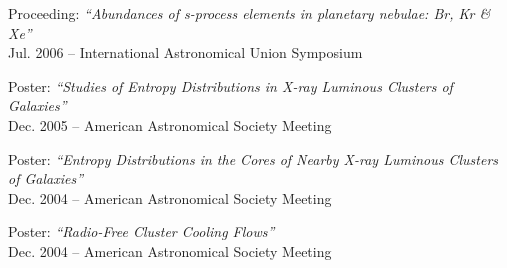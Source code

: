 \documentclass[12pt]{cv}
\begin{document}
\begin{llist}
{\sc Proceeding: {\textit{``Abundances of s-process elements in planetary nebulae: Br, Kr \& Xe''}}}\\
Jul. 2006 -- International Astronomical Union Symposium

{\sc Poster: {\textit{``Studies of Entropy Distributions in X-ray Luminous Clusters of Galaxies''}}}\\
Dec. 2005 -- American Astronomical Society Meeting

{\sc Poster: {\textit{``Entropy Distributions in the Cores of Nearby X-ray Luminous Clusters of Galaxies''}}}\\
Dec. 2004 -- American Astronomical Society Meeting

{\sc Poster: {\textit{``Radio-Free Cluster Cooling Flows''}}}\\
Dec. 2004 -- American Astronomical Society Meeting



\end{llist}
\end{document}
